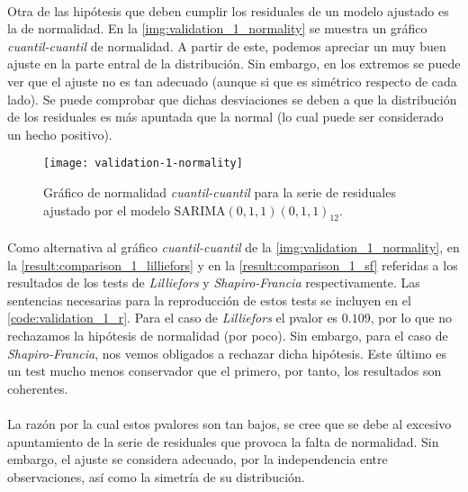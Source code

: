 \documentclass[a4paper, spanish]{article}
\begin{document}
      \paragraph{}
      Otra de las hipótesis que deben cumplir los residuales de un modelo ajustado es la de normalidad. En la \autoref{img:validation_1_normality} se muestra un gráfico \emph{cuantil-cuantil} de normalidad. A partir de este, podemos apreciar un muy buen ajuste en la parte entral de la distribución. Sin embargo, en los extremos se puede ver que el ajuste no es tan adecuado (aunque si que es simétrico respecto de cada lado). Se puede comprobar que dichas desviaciones se deben a que la distribución de los residuales es más apuntada que la normal (lo cual puede ser considerado un hecho positivo).

      \begin{figure}[htb!]
        \centering
        \texttt{[image: validation-1-normality]}
        \caption{Gráfico de normalidad \emph{cuantil-cuantil} para la serie de residuales ajustado por el modelo $\text{SARIMA}(0, 1, 1)(0, 1, 1)_{12}$.}
        \label{img:validation_1_normality}
      \end{figure}

      \paragraph{}
      Como alternativa al gráfico \emph{cuantil-cuantil} de la \autoref{img:validation_1_normality}, en la \autoref{result:comparison_1_lilliefors} y en la \autoref{result:comparison_1_sf} referidas a los resultados de los tests de \emph{Lilliefors} y \emph{Shapiro-Francia} respectivamente. Las sentencias necesarias para la reproducción de estos tests se incluyen en el \autoref{code:validation_1_r}. Para el caso de \emph{Lilliefors} el pvalor es $0.109$, por lo que no rechazamos la hipótesis de normalidad (por poco). Sin embargo, para el caso de \emph{Shapiro-Francia}, nos vemos obligados a rechazar dicha hipótesis. Este último es un test mucho menos conservador que el primero, por tanto, los resultados son coherentes.

      \paragraph{}
      La razón por la cual estos pvalores son tan bajos, se cree que se debe al excesivo apuntamiento de la serie de residuales que provoca la falta de normalidad. Sin embargo, el  ajuste se considera adecuado, por la independencia entre observaciones, así como la simetría de su distribución.
\end{document}
